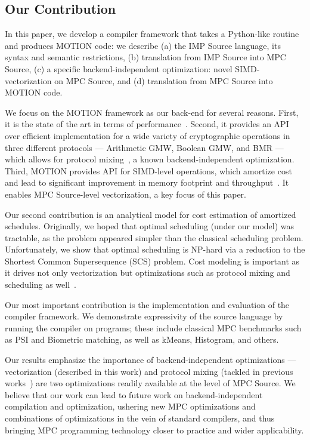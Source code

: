 \subsection{Our Contribution} In this paper, we develop a compiler framework that takes a Python-like routine and produces MOTION code: we describe (a) the IMP Source language, its syntax and semantic restrictions, (b) translation from IMP Source into MPC Source, (c) a specific backend-independent optimization: novel SIMD-vectorization on MPC Source, and (d) translation from MPC Source into MOTION code. %

We focus on the MOTION framework as our back-end for several reasons. First, it is the state of the art in terms of performance~\cite{Braun:2022}. Second, it provides an API over efficient implementation for a wide variety of cryptographic operations in three different protocols ---  Arithmetic GMW, Boolean GMW, and BMR --- which allows for protocol mixing~\cite{Ishaq:2019, Fang:2022}, a known backend-independent optimization. Third, MOTION provides API for SIMD-level operations, which amortize cost and lead to significant improvement in memory footprint and
throughput~\cite{NDSS:DemSchZoh15, CCS:ABFKLO18, Braun:2022}. It enables MPC Source-level vectorization, a key focus of this paper.

Our second contribution is an analytical model for cost estimation of amortized schedules. Originally, we hoped that optimal scheduling (under our model) was tractable, as the problem
appeared simpler than the classical scheduling problem. Unfortunately, we show that optimal scheduling is NP-hard via a reduction to the Shortest Common Supersequence (SCS) problem.
Cost modeling is important as it drives not only vectorization but optimizations such as protocol mixing and scheduling as well~\cite{Ishaq:2019, Fang:2022}.

Our most important contribution is the implementation and evaluation of the compiler framework. We demonstrate expressivity of the source language by running the compiler on  programs; these include classical MPC benchmarks such as PSI and Biometric matching, as well as kMeans, Histogram, and others. 

Our results emphasize the importance of backend-independent optimizations --- vectorization (described in this work) and protocol mixing (tackled in previous works~\cite{CCS:BDKKS18,Ishaq:2019, Fang:2022}) are two optimizations readily available at the level of MPC Source. We believe that our work can lead to future work on backend-independent compilation and optimization, ushering new MPC optimizations and combinations of optimizations in the vein of standard compilers, and thus bringing MPC programming technology closer to practice and wider applicability.

